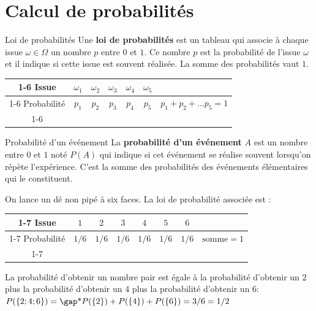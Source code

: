 \documentclass[10pt,a4paper,openany,twoside, prof]{book}
\begin{document}
\section{Calcul de probabilités}
\begin{defi}{Loi de probabilités}{}
   Une \textbf{loi de probabilités} est un tableau qui associe à chaque issue $\omega\in\Omega$ un nombre $p$ entre $0$ et $1$. Ce nombre $p$ est la probabilité de l'issue $\omega$ et il indique si cette issue est souvent réalisée. La somme des probabilités vaut $1$.

   \begin{center}
   \begin{tabular}{|c||*{5}{c|}c}
         \cline{1-6}
         Issue & $\omega_1$ & $\omega_2$ & $\omega_3$ & $\omega_4$ & $\omega_5$ &\\
         \cline{1-6}
         Probabilité & $p_1$ & $p_2$ & $p_3$ & $p_4$ & $p_5$ & \qquad $p_1+p_2+\dots p_5 = 1$ \\
         \cline{1-6}
      \end{tabular}
   \end{center}
\end{defi}

\begin{defi}{Probabilité d'un événement}{}
   La \textbf{probabilité d'un événement} $A$ est un nombre entre $0$ et $1$ noté $P(A)$ qui indique si cet événement se réalise souvent lorsqu'on répète l'expérience. C'est la somme des probabilités des événements élémentaires qui le constituent.
\end{defi}

\begin{ex}{}{}
On lance un dé non pipé à six faces. La loi de probabilité associée est :
\begin{reponse}
      \begin{center}
   \begin{tabular}{|c||*{6}{c|}c}
         \cline{1-7}
         Issue & $1$ & $2$ & $3$ & $4$ & $5$ & $6$ &\\
         \cline{1-7}
         Probabilité & $1/6$ & $1/6$& $1/6$& $1/6$& $1/6$& $1/6$ & \qquad $\text{somme} = 1$ \\
         \cline{1-7}
      \end{tabular}
   \end{center}
\end{reponse}

La probabilité d'obtenir un nombre pair est égale à la probabilité d'obtenir un 2 plus la probabilité d'obtenir un 4 plus la probabilité d'obtenir un 6: $P(\{2;4;6\})=\troum{P(\{2\})+P(\{4\})+P(\{6\}) = 3/6 = 1/2}$
\end{ex}
\end{document}
